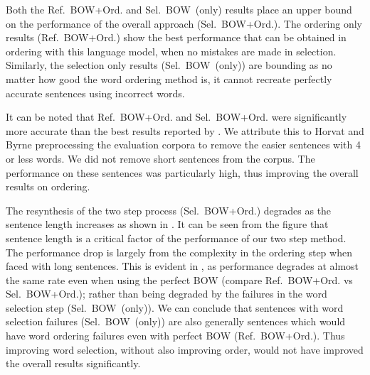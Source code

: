 \documentclass[11pt]{article}
\theoremstyle{plain}
\theoremstyle{definition}
\newcommand{\textcite}{\protect\newcite}
\newcommand{\oracletitle}{Ref.~BOW+Ord.}
\newcommand{\selectiontitle}{Sel.~BOW~(only)}
\newcommand{\twosteptitle}{Sel.~BOW+Ord.}
\begin{document}
Both the \oracletitle{} and \selectiontitle{} results place an upper bound on the performance of the overall approach (\twosteptitle{}). The ordering only results (\oracletitle{}) show the best performance that can be obtained in ordering with this language model, when no mistakes are made in selection. Similarly, the selection only results (\selectiontitle{}) are bounding as no matter how good the word ordering method is, it cannot recreate perfectly accurate sentences using incorrect words.


It can be noted that \oracletitle{} and \twosteptitle{} were significantly more accurate than the best results reported by \textcite{Horvat2014}. We attribute this to Horvat and Byrne preprocessing the evaluation corpora to remove the easier sentences with 4 or less words. We did not remove short sentences from the corpus. The performance on these sentences was particularly high, thus improving the overall results on ordering.

\begin{comment}
The resynthesis of the two step process (\twosteptitle{}) degrades as the sentence length increases as shown in \Cref{figure:exactlenscore}. It can be seen from the figure that this is largely caused by errors in the ordering step, rather than in the selection step. Though the selection failures are responsible for the drop in performance of \twosteptitle{} below that of the \oracletitle{}, this decrease is much less than the number of errors  that occur in \selectiontitle{} at that given sentence length. Thus for many sentences even if the word selection was perfect (as in \oracletitle{}), the over all result would still have been imperfect due to failure in finding the order. Thus improving word selection, without also improving order, would not have improved the overall results significantly.
\end{comment}

The resynthesis of the two step process (\twosteptitle{}) degrades as the sentence length increases as shown in . It can be seen from the figure that sentence length is a critical factor of the performance of our two step method. The performance drop is largely from the complexity in the ordering step when faced with long sentences. This is evident in , as performance degrades at almost the same rate even when using the perfect BOW (compare \oracletitle{} vs \twosteptitle{}); rather than being degraded by the failures in the word selection step (\selectiontitle{}). We can conclude that sentences with word selection failures (\selectiontitle{}) are also generally sentences which would have word ordering failures even with perfect BOW (\oracletitle{}). Thus improving word selection, without also improving order, would not have improved the overall results significantly.
\end{document}
